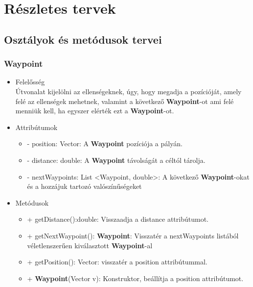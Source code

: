 %
\chapter{Részletes tervek}

\thispagestyle{fancy}

\section{Osztályok és metódusok tervei}

\subsection{Waypoint}
\begin{itemize}
\item Felelősség\\
Útvonalat kijelölni az ellenségeknek, úgy, hogy megadja a pozícióját, amely felé az ellenségek mehetnek, valamint a következő  \textbf{Waypoint}-ot ami felé menniük kell, ha egyszer elérték ezt a  \textbf{Waypoint}-ot.
\item Attribútumok
	\begin{itemize}
		\item - position: Vector: A \textbf{Waypoint} pozíciója a pályán.
		\item - distance: double: A  \textbf{Waypoint} távolságát a céltól tárolja.
		\item - nextWaypoints: List <Waypoint, double>: A következő  \textbf{Waypoint}-okat és a hozzájuk tartozó valószínűségeket
	\end{itemize}
\item Metódusok
	\begin{itemize}
		\item + getDistance():double: Visszaadja a distance attribútumot.
		\item + getNextWaypoint(): \textbf{Waypoint}: Visszatér a nextWaypoints listából véletlenszerűen kiválasztott \textbf{Waypoint}-al
		\item + getPosition(): Vector: visszatér a position attribútummal.
		\item + \textbf{Waypoint}(Vector v): Konstruktor, beállítja a position attribútumot. 
	\end{itemize}
\end{itemize}

